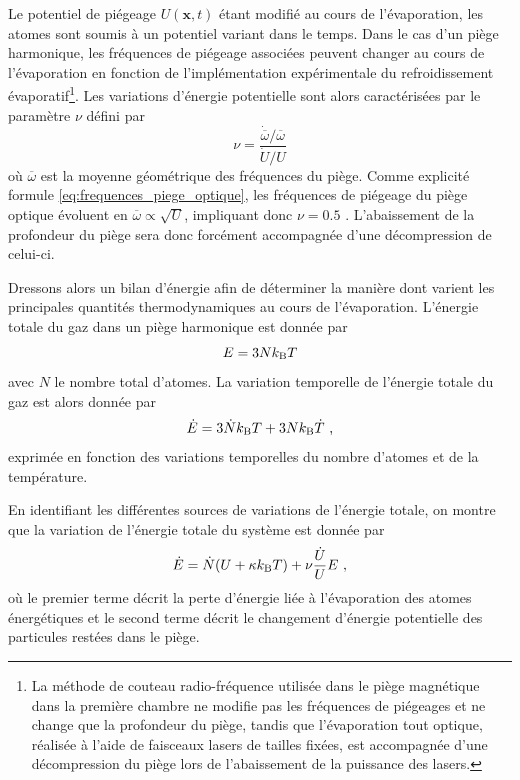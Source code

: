 Le potentiel de piégeage $U(\mathbf{x},t)$ étant modifié au cours de l'évaporation, les atomes sont soumis à un potentiel variant dans le temps. Dans le cas d'un piège harmonique, les fréquences de piégeage associées peuvent changer au cours de l'évaporation en fonction de l'implémentation expérimentale du refroidissement évaporatif\footnote{La méthode de couteau radio-fréquence utilisée dans le piège magnétique dans la première chambre ne modifie pas les fréquences de piégeages et ne change que la profondeur du piège, tandis que l'évaporation tout optique, réalisée à l'aide de faisceaux lasers de tailles fixées, est accompagnée d'une décompression du piège lors de l'abaissement de la puissance des lasers.}. Les variations d'énergie potentielle sont alors caractérisées par le paramètre $\nu$ défini par
\begin{equation}
\nu=\frac{\dot{\overline{\omega}}/\overline{\omega}}{\dot{U}/U}
\end{equation}
où $\overline{\omega}$ est la moyenne géométrique des fréquences du piège. Comme explicité formule \ref{eq:frequences_piege_optique}, les fréquences de piégeage du piège optique évoluent en $\overline{\omega}\propto\sqrt{U}$, impliquant donc $\nu=0.5$ \citep{o2001scaling}. L'abaissement de la profondeur du piège sera donc forcément accompagnée d'une décompression de celui-ci. 




Dressons alors un bilan d'énergie afin de déterminer la manière dont varient les principales quantités thermodynamiques au cours de l'évaporation. L'énergie totale du gaz dans un piège harmonique est donnée par
\begin{equation}
E=3Nk_{\mathrm{B}} T
\end{equation}
avec $N$ le nombre total d'atomes. La variation temporelle de l'énergie totale du gaz est alors donnée par
\begin{equation}
\dot{E}=3\dot{N} k_{\mathrm{B}} T + 3 N k_{\mathrm{B}} \dot{T} \text{ ,}
\label{eq:variation_energie_derivee}
\end{equation}
exprimée en fonction des variations temporelles du nombre d'atomes et de la température.

En identifiant les différentes sources de variations de l'énergie totale, on montre que la variation de l'énergie totale du système est donnée par \citep{cohen1996atomes}
\begin{equation}
\dot{E}=\dot{N}(U+\kappa k_{\mathrm{B}} T) +\nu\frac{\dot{U}}{U}E \text{ ,}
\label{eq:variation_energie_bilan}
\end{equation}
où le premier terme décrit la perte d'énergie liée à l'évaporation des atomes énergétiques et le second terme décrit le changement d'énergie potentielle des particules restées dans le piège.

